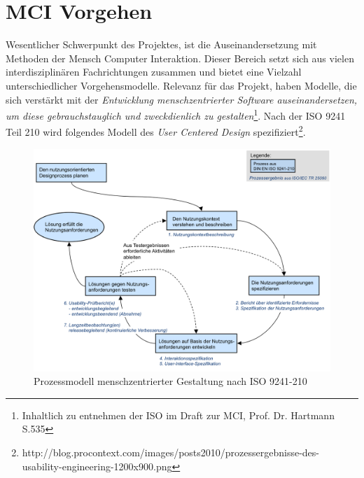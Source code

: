 
\chapter{MCI Vorgehen}
Wesentlicher Schwerpunkt des Projektes, ist die Auseinandersetzung mit Methoden der Mensch Computer Interaktion. Dieser Bereich  setzt sich aus vielen interdisziplinären Fachrichtungen zusammen und bietet eine Vielzahl unterschiedlicher Vorgehensmodelle. 
Relevanz für das Projekt, haben Modelle, die sich verstärkt mit der \textit{Entwicklung menschzentrierter Software auseinandersetzen, um diese gebrauchstauglich und zweckdienlich zu gestalten}\footnote{Inhaltlich zu entnehmen der ISO im Draft zur MCI, Prof. Dr. Hartmann S.535}.
Nach der ISO 9241 Teil 210 wird folgendes Modell des \textit{User Centered Design} spezifiziert\footnote{http://blog.procontext.com/images/posts2010/prozessergebnisse-des-usability-engineering-1200x900.png}. 

\begin{figure}[H]
\includegraphics[width=.9\textwidth]{./images/prozessergebnisse.png}
\caption{Prozessmodell menschzentrierter Gestaltung nach ISO 9241-210 }
\label{prozessmodell}
\end{figure}

